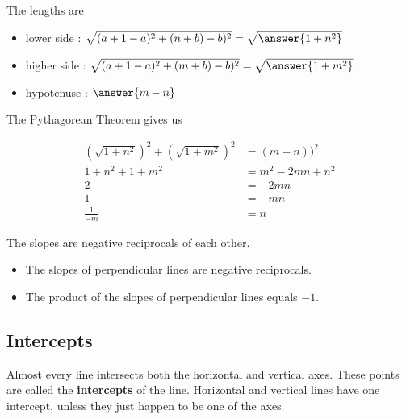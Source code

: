 \documentclass{ximera}
\begin{document}
\begin{question}

The lengths are

\begin{itemize}
\item lower side : $\sqrt{(a + 1 - a)^2 + (n + b) - b)^2} = \sqrt{\answer{1 + n^2}}$
\item higher side : $\sqrt{(a + 1 - a)^2 + (m + b) - b)^2} = \sqrt{\answer{1 + m^2}}$
\item hypotenuse : $\answer{m-n}$
\end{itemize}

\end{question}





The Pythagorean Theorem gives us


\begin{align*}
\left(\sqrt{1 + n^2}\right)^2 + \left(\sqrt{1 + m^2}\right)^2 & = (m-n))^2 \\
1 + n^2 + 1 + m^2 & = m^2 - 2 m n + n^2  \\
2 & = -2 m n \\
1 & = -m n \\
\frac{1}{-m} & = n
\end{align*}

The slopes are negative reciprocals of each other. \\


\begin{itemize}
\item The slopes of perpendicular lines are negative reciprocals.
\item The product of the slopes of perpendicular lines equals $-1$.
\end{itemize}



















\subsection*{Intercepts}


Almost every line intersects both the horizontal and vertical axes.  These points are called the \textbf{intercepts} of the line.  Horizontal and vertical lines have one intercept, unless they just happen to be one of the axes. \\
\end{document}
